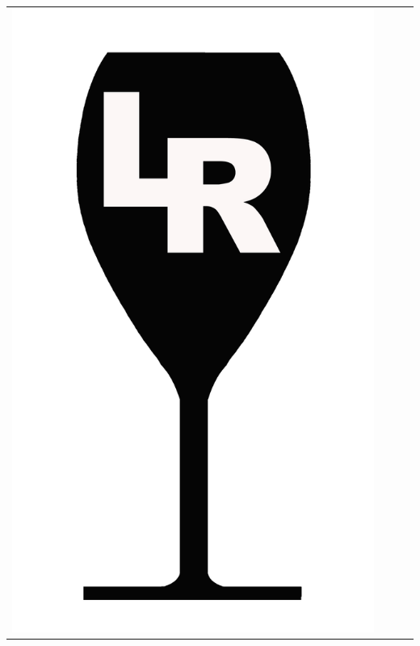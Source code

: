 {\begin{center}
\begin{tabular}{ c c c c}
\includegraphics[scale=0.021, trim= 0em -5em -5em -5em,]{Icones/icon_languedoc_black.pdf}
&

\end{tabular}
\end{center}}
